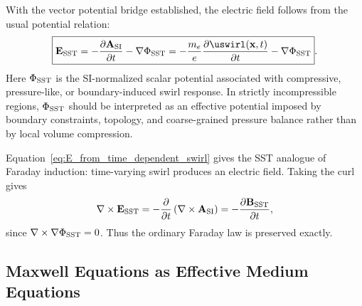     With the vector potential bridge established, the electric field follows
    from the usual potential relation:
    \begin{equation}
        \boxed{
            \mathbf{E}_{\rm SST}
            =
            -\frac{\partial\mathbf{A}_{\rm SI}}{\partial t}
            -
            \nabla\Phi_{\rm SST}
            =
            -\frac{m_e}{e}
            \frac{\partial\uswirl(\mathbf{x},t)}{\partial t}
            -
            \nabla\Phi_{\rm SST}
        } .
        \label{eq:E_from_time_dependent_swirl}
    \end{equation}
    Here \(\Phi_{\rm SST}\) is the SI-normalized scalar potential associated
    with compressive, pressure-like, or boundary-induced swirl response.  In
    strictly incompressible regions, \(\Phi_{\rm SST}\) should be interpreted
    as an effective potential imposed by boundary constraints, topology, and
    coarse-grained pressure balance rather than by local volume compression.
    
    Equation~\eqref{eq:E_from_time_dependent_swirl} gives the SST analogue of
    Faraday induction: time-varying swirl produces an electric field.  Taking
    the curl gives
    \begin{equation}
        \nabla\times\mathbf{E}_{\rm SST}
        =
        -
        \frac{\partial}{\partial t}
        \left(
            \nabla\times\mathbf{A}_{\rm SI}
        \right)
        =
        -
        \frac{\partial\mathbf{B}_{\rm SST}}{\partial t},
        \label{eq:faraday_from_swirl}
    \end{equation}
    since \(\nabla\times\nabla\Phi_{\rm SST}=0\).  Thus the ordinary Faraday
    law is preserved exactly.

\subsection{Maxwell Equations as Effective Medium Equations}
    

